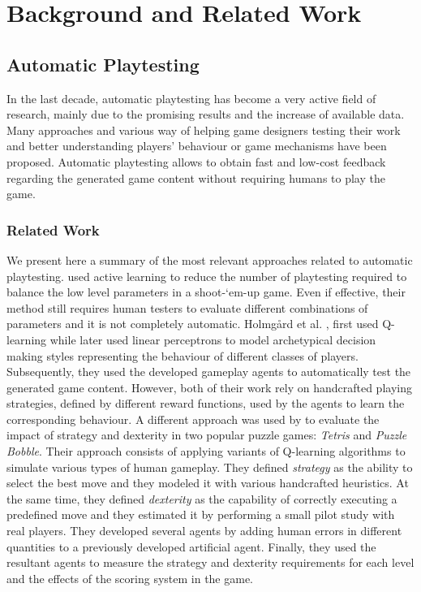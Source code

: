 \chapter{Background and Related Work}
\label{chap:background}
\section{Automatic Playtesting}
In the last decade, automatic playtesting has become a very active field of research, mainly due to the promising results and the increase of available data. Many approaches and various way of helping game designers testing their work and better understanding players' behaviour or game mechanisms have been proposed. Automatic playtesting allows to obtain fast and low-cost feedback regarding the generated game content without requiring humans to play the game. 

\subsection{Related Work} \label{Automatic Playtesting Related Work}
We present here a summary of the most relevant approaches related to automatic playtesting. \textcite{zook_automatic_2014} used active learning to reduce the number of playtesting required to balance the low level parameters in a shoot-‘em-up game. Even if effective, their method still requires human testers to evaluate different combinations of parameters and it is not completely automatic. Holmgård et al. \cite{holmgard_evolving_2014}, first used Q-learning while later \cite{holmgard_evolving_2016} used linear perceptrons  to model archetypical decision making styles representing the behaviour of different classes of players. Subsequently, they used the developed gameplay agents to automatically test the generated game content. However, both of their work rely on handcrafted playing strategies, defined by different reward functions, used by the agents to learn the corresponding behaviour. A different approach was used by \textcite{isaksen_simulating_2017} to evaluate the impact of strategy and dexterity in two popular puzzle games: \textit{Tetris} and \textit{Puzzle Bobble}. Their approach consists of applying variants of Q-learning algorithms to simulate various types of human gameplay. They defined \textit{strategy} as the ability to select the best move and they modeled it with various handcrafted heuristics. At the same time, they defined \textit{dexterity} as the capability of correctly executing a predefined move and they estimated it by performing a small pilot study with real players. They developed several agents by adding human errors in different quantities to a previously developed artificial agent. Finally, they used the resultant agents to measure the strategy and dexterity requirements for each level and the effects of the scoring system in the game.  

